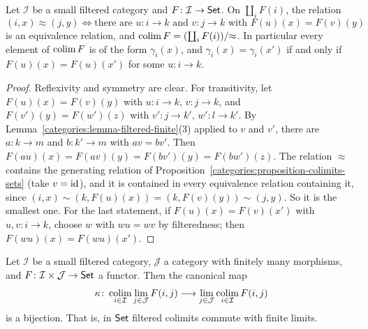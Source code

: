 \begin{proposition}\label{categories:proposition-filtered-colimits-sets}
Let $\mathcal{I}$ be a small filtered category and $F \colon \mathcal{I} \to \mathsf{Set}$. On
$\coprod_i F(i)$, the relation
\[
(i, x) \approx (j, y) \iff \text{there are } u \colon i \to k \text{ and } v \colon j \to k
\text{ with } F(u)(x) = F(v)(y)
\]
is an equivalence relation, and $\operatorname*{colim} F = (\coprod_i F(i))/{\approx}$. In particular
every element of $\operatorname*{colim} F$ is of the form $\gamma_i(x)$, and $\gamma_i(x) = \gamma_i(x')$
if and only if $F(u)(x) = F(u)(x')$ for some $u \colon i \to k$.
\end{proposition}

\begin{proof}
Reflexivity and symmetry are clear. For transitivity, let
$F(u)(x) = F(v)(y)$ with $u \colon i \to k$, $v \colon j \to k$, and
$F(v')(y) = F(w')(z)$ with $v' \colon j \to k'$, $w' \colon l \to k'$. By
Lemma~\ref{categories:lemma-filtered-finite}(3) applied to $v$ and $v'$, there are
$a \colon k \to m$ and $b \colon k' \to m$ with $av = bv'$. Then
$F(au)(x) = F(av)(y) = F(bv')(y) = F(bw')(z)$. The relation $\approx$ contains the
generating relation of Proposition~\ref{categories:proposition-colimits-sets}
(take $v = \mathrm{id}$), and it is contained in every equivalence relation containing
it, since $(i, x) \sim (k, F(u)(x)) = (k, F(v)(y)) \sim (j, y)$. So it is the
smallest one. For the last statement, if $F(u)(x) = F(v)(x')$ with
$u, v \colon i \to k$, choose $w$ with $wu = wv$ by filteredness; then
$F(wu)(x) = F(wu)(x')$.
\end{proof}

\begin{theorem}\label{categories:theorem-filtered-colimits-finite-limits}
Let $\mathcal{I}$ be a small filtered category, $\mathcal{J}$ a category with finitely
many morphisms, and $F \colon \mathcal{I} \times \mathcal{J} \to \mathsf{Set}$ a functor. Then the
canonical map
\[
\kappa \colon \operatorname*{colim}_{i \in \mathcal{I}} \lim_{j \in \mathcal{J}} F(i, j) \longrightarrow
\lim_{j \in \mathcal{J}} \operatorname*{colim}_{i \in \mathcal{I}} F(i, j)
\]
is a bijection. That is, in $\mathsf{Set}$ filtered colimits commute with finite
limits.
\end{theorem}

